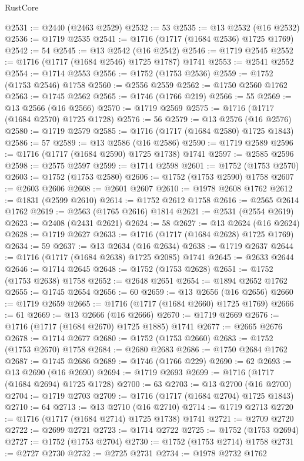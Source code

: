 \begin{lexlean}{RustCore}
\begin{coremodule}
@2531 := @2440 (@2463 @2529)
@2532 := 53
@2535 := @13 @2532 (@16 @2532)
@2536 := @1719 @2535
@2541 := @1716 (@1717 (@1684 @2536) @1725 @1769)
@2542 := 54
@2545 := @13 @2542 (@16 @2542)
@2546 := @1719 @2545
@2552 := @1716 (@1717 (@1684 @2546) @1725 @1787) @1741
@2553 := @2541 @2552
@2554 := @1714 @2553
@2556 := @1752 (@1753 @2536)
@2559 := @1752 (@1753 @2546) @1758
@2560 := @2556 @2559
@2562 := @1750 @2560 @1762
@2563 := @1745 @2562
@2565 := @1746 (@1766 @219)
@2566 := 55
@2569 := @13 @2566 (@16 @2566)
@2570 := @1719 @2569
@2575 := @1716 (@1717 (@1684 @2570) @1725 @1728)
@2576 := 56
@2579 := @13 @2576 (@16 @2576)
@2580 := @1719 @2579
@2585 := @1716 (@1717 (@1684 @2580) @1725 @1843)
@2586 := 57
@2589 := @13 @2586 (@16 @2586)
@2590 := @1719 @2589
@2596 := @1716 (@1717 (@1684 @2590) @1725 @1738) @1741
@2597 := @2585 @2596
@2598 := @2575 @2597
@2599 := @1714 @2598
@2601 := @1752 (@1753 @2570)
@2603 := @1752 (@1753 @2580)
@2606 := @1752 (@1753 @2590) @1758
@2607 := @2603 @2606
@2608 := @2601 @2607
@2610 := @1978 @2608 @1762
@2612 := @1831 (@2599 @2610)
@2614 := @1752 @2612 @1758
@2616 := @2565 @2614 @1762
@2619 := @2563 (@1765 @2616) @1814
@2621 := @2531 (@2554 @2619)
@2623 := @2408 (@2431 @2621)
@2624 := 58
@2627 := @13 @2624 (@16 @2624)
@2628 := @1719 @2627
@2633 := @1716 (@1717 (@1684 @2628) @1725 @1769)
@2634 := 59
@2637 := @13 @2634 (@16 @2634)
@2638 := @1719 @2637
@2644 := @1716 (@1717 (@1684 @2638) @1725 @2085) @1741
@2645 := @2633 @2644
@2646 := @1714 @2645
@2648 := @1752 (@1753 @2628)
@2651 := @1752 (@1753 @2638) @1758
@2652 := @2648 @2651
@2654 := @1894 @2652 @1762
@2655 := @1745 @2654
@2656 := 60
@2659 := @13 @2656 (@16 @2656)
@2660 := @1719 @2659
@2665 := @1716 (@1717 (@1684 @2660) @1725 @1769)
@2666 := 61
@2669 := @13 @2666 (@16 @2666)
@2670 := @1719 @2669
@2676 := @1716 (@1717 (@1684 @2670) @1725 @1885) @1741
@2677 := @2665 @2676
@2678 := @1714 @2677
@2680 := @1752 (@1753 @2660)
@2683 := @1752 (@1753 @2670) @1758
@2684 := @2680 @2683
@2686 := @1750 @2684 @1762
@2687 := @1745 @2686
@2689 := @1746 (@1766 @229)
@2690 := 62
@2693 := @13 @2690 (@16 @2690)
@2694 := @1719 @2693
@2699 := @1716 (@1717 (@1684 @2694) @1725 @1728)
@2700 := 63
@2703 := @13 @2700 (@16 @2700)
@2704 := @1719 @2703
@2709 := @1716 (@1717 (@1684 @2704) @1725 @1843)
@2710 := 64
@2713 := @13 @2710 (@16 @2710)
@2714 := @1719 @2713
@2720 := @1716 (@1717 (@1684 @2714) @1725 @1738) @1741
@2721 := @2709 @2720
@2722 := @2699 @2721
@2723 := @1714 @2722
@2725 := @1752 (@1753 @2694)
@2727 := @1752 (@1753 @2704)
@2730 := @1752 (@1753 @2714) @1758
@2731 := @2727 @2730
@2732 := @2725 @2731
@2734 := @1978 @2732 @1762

\end{coremodule}
\end{lexlean}
